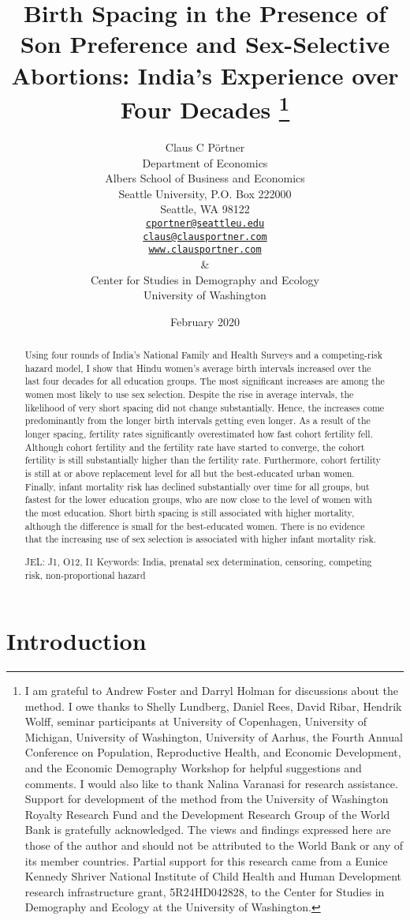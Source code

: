 \documentclass[12pt,letterpaper]{article}
\title{Birth Spacing in the Presence of Son Preference and Sex-Selective Abortions:
India's Experience over Four Decades%
\protect\thanks{%
I am grateful to Andrew Foster and Darryl Holman for discussions about the method.
I owe thanks to Shelly Lundberg, Daniel Rees, David Ribar, 
Hendrik Wolff, seminar participants at University of Copenhagen, University of Michigan, 
University of Washington, University of Aarhus, the Fourth 
Annual Conference on Population, Reproductive Health, 
and Economic Development, and the Economic Demography Workshop for helpful 
suggestions and comments.
I would also like to thank Nalina Varanasi for research assistance.
Support for development of the method from the University of Washington Royalty 
Research Fund and the Development Research Group of the World Bank is gratefully 
acknowledged.
The views and findings expressed here are those of the author and
should not be attributed to the World Bank or any of its member countries.
Partial support for this research came from a Eunice Kennedy Shriver National
Institute of Child Health and Human Development research infrastructure grant,
5R24HD042828, to the Center for Studies in Demography and Ecology at the
University of Washington.
}
}
\author{Claus C P\"ortner\\
    Department of Economics\\
    Albers School of Business and Economics\\
    Seattle University, P.O. Box 222000\\
    Seattle, WA 98122\\
    \href{mailto:cportner@seattleu.edu}{\texttt{cportner@seattleu.edu}}\\
    \href{mailto:claus@clausportner.com}{\texttt{claus@clausportner.com}}\\
    \href{http://www.clausportner.com}{\texttt{www.clausportner.com}}\\
    \& \\
    Center for Studies in Demography and Ecology \\
    University of Washington\\ \vspace{2cm}
    }
\date{February 2020}
\begin{document}
\graphicspath{{../figures/}}

\setcounter{page}{-1}
\maketitle
\thispagestyle{empty}



\newpage
\thispagestyle{empty}
\doublespacing

\begin{abstract}

\noindent 
Using four rounds of India's National Family and Health Surveys and a
competing-risk hazard model, I show that Hindu women's average birth intervals
increased over the last four decades for all education groups. The most
significant increases are among the women most likely to use sex
selection. Despite the rise in average intervals, the likelihood of very
short spacing did not change substantially. Hence, the increases come
predominantly from the longer birth intervals getting even longer. As a
result of the longer spacing, fertility rates significantly
overestimated how fast cohort fertility fell. Although cohort fertility
and the fertility rate have started to converge, the cohort fertility is
still substantially higher than the fertility rate. Furthermore, cohort
fertility is still at or above replacement level for all but the
best-educated urban women. Finally, infant mortality risk has declined
substantially over time for all groups, but fastest for the lower
education groups, who are now close to the level of women with the most
education. Short birth spacing is still associated with higher
mortality, although the difference is small for the best-educated women.
There is no evidence that the increasing use of sex selection is
associated with higher infant mortality risk.

\noindent JEL: J1, O12, I1
\noindent Keywords: India, prenatal sex determination, censoring, competing risk, non-proportional hazard
\end{abstract}

\newpage



\section{Introduction\label{sec:intro}}
\end{document}
